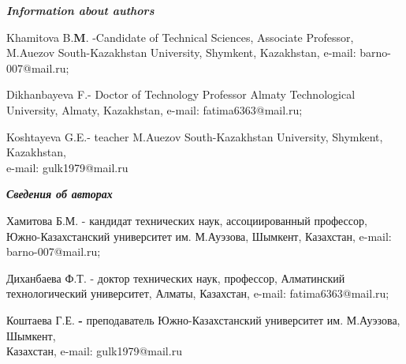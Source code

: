 \emph{{\bfseries Information about authors}}

\begin{noparindent}

Khamitova B.{\bfseries M}. -Candidate of Technical Sciences, Associate
Professor, M.Auezov South-Kazakhstan University, Shymkent, Kazakhstan,
e-mail: barno-007@mail.ru;

Dikhanbayeva F.- Doctor of Technology Professor Almaty Technological
University, Almaty, Kazakhstan, e-mail: fatima6363@mail.ru;

Koshtayeva G.E.- teacher M.Auezov South-Kazakhstan University, Shymkent,
Kazakhstan, \\e-mail: gulk1979@mail.ru

\end{noparindent}

\emph{{\bfseries Сведения об авторах}}

\begin{noparindent}

Хамитова Б.М. - кандидат технических наук, ассоциированный профессор,
Южно-Казахстанский университет им. М.Ауэзова, Шымкент, Казахстан,
e-mail: barno-007@mail.ru;

Диханбаева Ф.Т. - доктор технических наук, профессор, Алматинский
технологический университет, Алматы, Казахстан, e-mail:
fatima6363@mail.ru;

Коштаева Г.Е. {\bfseries -} преподаватель Южно-Казахстанский университет
им. М.Ауэзова, Шымкент,\\ Казахстан, e-mail: gulk1979@mail.ru
\end{noparindent}
